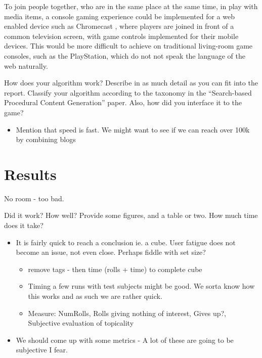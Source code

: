 \documentclass[]{article}
\begin{document}
To join people together, who are in the same place at the same time, in play with media items, a console gaming experience could be implemented for a web enabled device such as Chromecast \cite{ChromecastGames}, where players are joined in front of a common television screen, with game controls implemented for their mobile devices.  This would be more difficult to achieve on traditional living-room game consoles, such as the PlayStation, which do not not speak the language of the web naturally.



\begin{framed}
How does your algorithm work? Describe in as much detail as you can fit into the report. Classify your algorithm according to the taxonomy in the “Search-based Procedural Content Generation” paper. Also, how did you interface it to the game?
\end{framed}



\begin{itemize}
\item Mention that speed is fast. We might want to see if we can reach over 100k by combining blogs
\end{itemize}




\section{Results}
\label{sec:Results}
No room - too bad.
\begin{framed}
Did it work? How well? Provide some figures, and a table or two. How much time does it take?
\end{framed}
\begin{itemize}		
\item It is fairly quick to reach a conclusion ie. a cube. User fatigue does not become an issue, not even close. Perhaps fiddle with set size?
	\begin{itemize}
	\item remove tags - then time (rolls + time) to complete cube
	\item Timing a few runs with test subjects might be good. We sorta know how this works and as such we are rather quick.
	\item Measure: NumRolls, Rolls giving nothing of interest, Gives up?, Subjective evaluation of topicality
	\end{itemize}
\item We should come up with some metrics - A lot of these are going to be subjective I fear.
\end{itemize}
\end{document}
